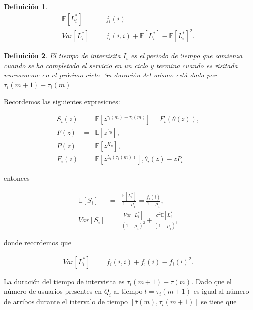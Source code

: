 \documentclass{article}
\newtheorem{Def}{Definición}[section]
\newcommand{\esp}{\mathbb{E}}
\numberwithin{equation}{section}
\begin{document}
{\begin{Def}
\begin{eqnarray}
\esp\left[L_{i}^{*}\right]&=&f_{i}\left(i\right)\\
Var\left[L_{i}^{*}\right]&=&f_{i}\left(i,i\right)+\esp\left[L_{i}^{*}\right]-\esp\left[L_{i}^{*}\right]^{2}.
\end{eqnarray}

\end{Def}


\begin{Def}
El tiempo de intervisita $I_{i}$ es el periodo de tiempo que comienza cuando se ha completado el servicio en un ciclo y termina cuando es visitada nuevamente en el pr\'oximo ciclo. Su  duraci\'on del mismo est\'a dada por $\tau_{i}\left(m+1\right)-\overline{\tau}_{i}\left(m\right)$.
\end{Def}


Recordemos las siguientes expresiones:

\begin{eqnarray*}
S_{i}\left(z\right)&=&\esp\left[z^{\overline{\tau}_{i}\left(m\right)-\tau_{i}\left(m\right)}\right]=F_{i}\left(\theta\left(z\right)\right),\\
F\left(z\right)&=&\esp\left[z^{L_{0}}\right],\\
P\left(z\right)&=&\esp\left[z^{X_{n}}\right],\\
F_{i}\left(z\right)&=&\esp\left[z^{L_{i}\left(\tau_{i}\left(m\right)\right)}\right],
\theta_{i}\left(z\right)-zP_{i}
\end{eqnarray*}

entonces 

\begin{eqnarray*}
\esp\left[S_{i}\right]&=&\frac{\esp\left[L_{i}^{*}\right]}{1-\mu_{i}}=\frac{f_{i}\left(i\right)}{1-\mu_{i}},\\
Var\left[S_{i}\right]&=&\frac{Var\left[L_{i}^{*}\right]}{\left(1-\mu_{i}\right)^{2}}+\frac{\sigma^{2}\esp\left[L_{i}^{*}\right]}{\left(1-\mu_{i}\right)^{3}}
\end{eqnarray*}

donde recordemos que

\begin{eqnarray*}
Var\left[L_{i}^{*}\right]&=&f_{i}\left(i,i\right)+f_{i}\left(i\right)-f_{i}\left(i\right)^{2}.
\end{eqnarray*}

La duraci\'on del tiempo de intervisita es $\tau_{i}\left(m+1\right)-\overline{\tau}\left(m\right)$. Dado que el n\'umero de usuarios presentes en $Q_{i}$ al tiempo $t=\tau_{i}\left(m+1\right)$ es igual al n\'umero de arribos durante el intervalo de tiempo $\left[\overline{\tau}\left(m\right),\tau_{i}\left(m+1\right)\right]$ se tiene que


}
\end{document}
